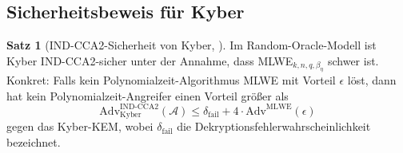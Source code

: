 ﻿\documentclass[a4paper,12pt]{article}
\theoremstyle{definition}
\newtheorem{satz}{Satz}[section]
\begin{document}
\subsection{Sicherheitsbeweis für Kyber}

\begin{satz}[IND-CCA2-Sicherheit von Kyber, \cite{ABD+22}]
Im Random-Oracle-Modell ist Kyber IND-CCA2-sicher unter der Annahme,
dass MLWE$_{k,n,q,\beta_\eta}$ schwer ist. Konkret: Falls kein
Polynomialzeit-Algorithmus MLWE mit Vorteil $\epsilon$ löst, dann hat kein
Polynomialzeit-Angreifer einen Vorteil größer als
\[
  \mathrm{Adv}^{\mathrm{IND\text{-}CCA2}}_{\mathrm{Kyber}}(\mathcal{A}) \leq
  \delta_\mathrm{fail} + 4 \cdot \mathrm{Adv}^{\mathrm{MLWE}}(\epsilon)
\]
gegen das Kyber-KEM, wobei $\delta_\mathrm{fail}$ die Dekryptionsfehlerwahrscheinlichkeit
bezeichnet.
\end{satz}
\end{document}
